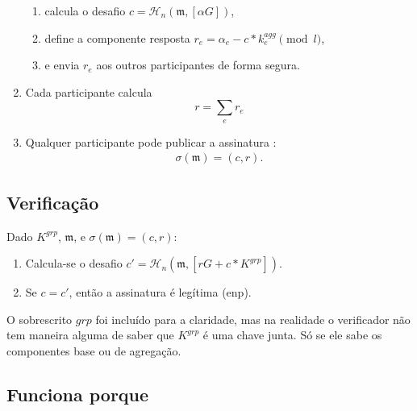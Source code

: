 \begin{enumerate}
    \begin{enumerate}
        \item calcula o desafio $c = \mathcal{H}_n(\mathfrak{m},[\alpha G])$,
        \item define a componente resposta $r_e = \alpha_e - c* k^{agg}_e \pmod l$,
        \item e envia $r_e$ aos outros participantes de forma segura.
    \end{enumerate}
    \item Cada participante calcula
    \[ r = \sum_e r_e\]
    \item Qualquer participante pode publicar a assinatura :
\begin{align*}
\sigma(\mathfrak{m}) = (c,r) .
\end{align*}
\end{enumerate}


\subsection*{Verificação}

Dado $K^{grp}$, $\mathfrak{m}$, e $\sigma(\mathfrak{m}) = (c,r)$:
\begin{enumerate}
    \item Calcula-se o desafio $c' = \mathcal{H}_n(\mathfrak{m},[r G + c*K^{grp}])$.
    \item Se $c = c'$, então a assinatura é legítima (enp).
\end{enumerate}

O sobrescrito $grp$ foi incluído para a claridade, mas na realidade o verificador não tem maneira alguma de saber que $K^{grp}$ é uma chave junta. Só se ele sabe os componentes base ou de agregação. 



\subsection*{Funciona porque}

